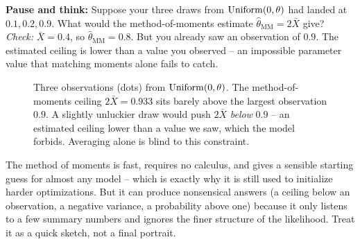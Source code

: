 \begin{recoverybox}
\textbf{Pause and think:} Suppose your three draws from $\operatorname{Uniform}(0,\theta)$ had
landed at $0.1, 0.2, 0.9$. What would the method-of-moments estimate
$\hat\theta_{\mathrm{MM}} = 2\bar X$ give?
\textit{Check:} $\bar X = 0.4$, so $\hat\theta_{\mathrm{MM}} = 0.8$. But you
already saw an observation of $0.9$. The estimated ceiling is lower than a value
you observed -- an impossible parameter value that matching moments
alone fails to catch.
\end{recoverybox}

\begin{figure}[H]
\centering
{}
\caption{Three observations (dots) from $\operatorname{Uniform}(0,\theta)$. The method-of-moments
ceiling $2\bar X = 0.933$ sits barely above the largest observation $0.9$. A
slightly unluckier draw would push $2\bar X$ \emph{below} $0.9$ -- an estimated
ceiling lower than a value we saw, which the model forbids. Averaging
alone is blind to this constraint.}
\label{ch30:fig-mom-unif}
\end{figure}

\begin{trapbox}
The method of moments is fast, requires no calculus, and gives a sensible
starting guess for almost any model -- which is exactly why it is still used to
initialize harder optimizations. But it can produce nonsensical answers (a
ceiling below an observation, a negative variance, a probability above one)
because it only listens to a few summary numbers and ignores the finer
structure of the likelihood. Treat it as a quick sketch, not a final portrait.
\end{trapbox}

